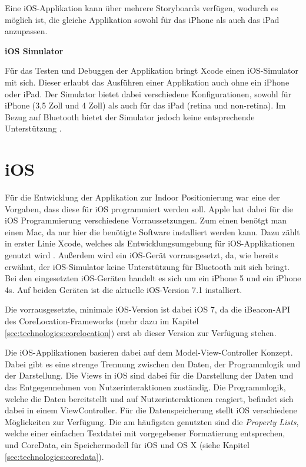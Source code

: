 Eine iOS-Applikation kann über mehrere Storyboards verfügen, wodurch es möglich ist, die gleiche Applikation sowohl für das iPhone als auch das iPad anzupassen.


\textbf{iOS Simulator}

Für das Testen und Debuggen der Applikation bringt Xcode einen iOS-Simulator mit sich. Dieser erlaubt das Ausführen einer Applikation auch ohne ein iPhone oder iPad. Der Simulator bietet dabei verschiedene Konfigurationen, sowohl für iPhone (3,5 Zoll und 4 Zoll) als auch für das iPad (retina und non-retina).
Im Bezug auf Bluetooth bietet der Simulator jedoch keine entsprechende Unterstützung \cite{iossimulator}.

\section{iOS}
\label{sec:technologies:iosandxcode}
Für die Entwicklung der Applikation zur Indoor Positionierung war eine der Vorgaben, dass diese für iOS programmiert werden soll.
Apple hat dabei für die iOS Programmierung verschiedene Vorraussetzungen. Zum einen benötgt man einen Mac, da nur hier die benötigte Software installiert werden kann.
Dazu zählt in erster Linie Xcode, welches als Entwicklungsumgebung für iOS-Applikationen genutzt wird \cite{iossetup}. 
Außerdem wird ein iOS-Gerät vorrausgesetzt, da, wie bereits erwähnt, der iOS-Simulator keine Unterstützung für Bluetooth mit sich bringt. 
Bei den eingesetzten iOS-Geräten handelt es sich um ein iPhone 5 und ein iPhone 4s. Auf beiden Geräten ist die aktuelle iOS-Version 7.1 installiert.

Die vorrausgesetzte, minimale iOS-Version ist dabei iOS 7, da die iBeacon-API des CoreLocation-Frameworks (mehr dazu im Kapitel \ref{sec:technologies:corelocation}) erst ab dieser Version zur Verfügung stehen.

Die iOS-Applikationen basieren dabei auf dem Model-View-Controller Konzept. Dabei gibt es eine strenge Trennung zwischen den Daten, der Programmlogik und der Darstellung. 
Die Views in iOS sind dabei für die Darstellung der Daten und das Entgegennehmen von Nutzerinteraktionen zuständig. Die Programmlogik, welche die Daten bereitstellt und auf Nutzerinteraktionen reagiert, befindet sich dabei in einem ViewController. Für die Datenspeicherung stellt iOS verschiedene Möglickeiten zur Verfügung. Die am häufigsten genutzten sind die \emph{Property Lists}, welche einer einfachen Textdatei mit vorgegebener Formatierung entsprechen, und CoreData, ein Speichermodell für iOS und OS X (siehe Kapitel \ref{sec:technologies:coredata}).

